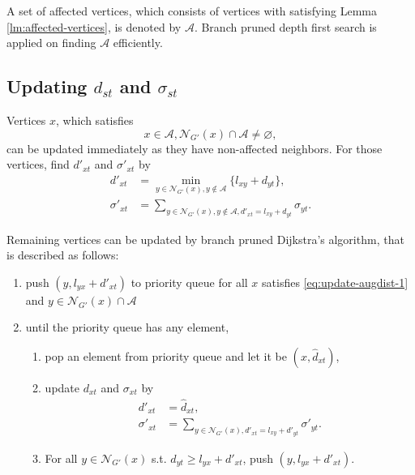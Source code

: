 \documentclass[twocolumn]{article}
\begin{document}
  A set of affected vertices, which consists of vertices with satisfying Lemma \ref{lm:affected-vertices}, is denoted by $\mathcal{A}$.
  Branch pruned depth first search is applied on finding $\mathcal{A}$ efficiently.

  \subsection*{Updating $d_{st}$ and $\sigma_{st}$}
  Vertices $x$, which satisfies
  \begin{equation}
    x\in\mathcal{A},\mathcal{N}_{G'}(x)\cap\mathcal{A}\neq\varnothing,
    \label{eq:update-augdist-1}
  \end{equation}
  can be updated immediately as they have non-affected neighbors.
  For those vertices, find $d'_{xt}$ and $\sigma'_{xt}$ by
  \begin{equation*}
    \begin{aligned}
      d'_{xt}&=\min_{y\in\mathcal{N}_{G'}(x),y\notin\mathcal{A}}\{l_{xy}+d_{yt}\}, \\
      \sigma'_{xt}&=\sum_{y\in\mathcal{N}_{G'}(x),y\notin\mathcal{A},d'_{xt}=l_{xy}+d_{yt}}\sigma_{yt}.
    \end{aligned}
  \end{equation*}

  Remaining vertices can be updated by branch pruned Dijkstra's algorithm, that is described as follows:
  \begin{enumerate}
  \item push $(y,l_{yx}+d'_{xt})$ to priority queue for all $x$ satisfies \eqref{eq:update-augdist-1} and $y\in\mathcal{N}_{G'}(x)\cap\mathcal{A}$
  \item until the priority queue has any element,
    \begin{enumerate}
    \item pop an element from priority queue and let it be $(x,\hat{d}_{xt})$,
    \item update $d_{xt}$ and $\sigma_{xt}$ by
      \begin{equation*}
        \begin{aligned}
          d'_{xt}&=\hat{d}_{xt}, \\
          \sigma'_{xt}&=\sum_{y\in\mathcal{N}_{G'}(x),d'_{xt}=l_{xy}+d'_{yt}}\sigma'_{yt}.
        \end{aligned}
      \end{equation*}
    \item For all $y\in\mathcal{N}_{G'}(x)$ s.t. $d_{yt}\geq l_{yx}+d'_{xt}$, push $(y,l_{yx}+d'_{xt})$.
    \end{enumerate}
  \end{enumerate}
\end{document}

